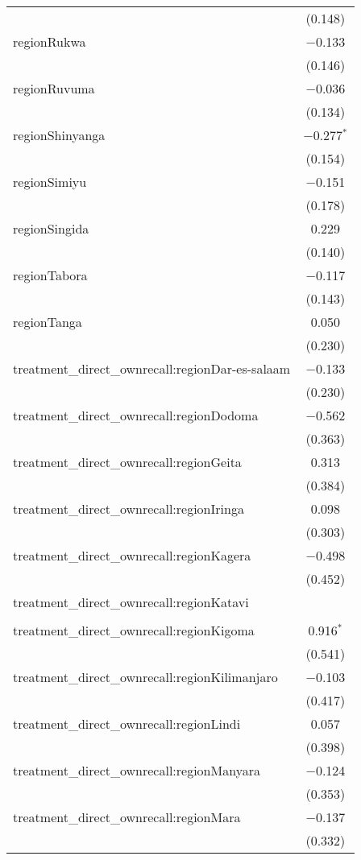 \begin{table}[!htbp]
\begin{tabular}{@{\extracolsep{5pt}}lc}
  & (0.148) \\ 
  regionRukwa & $-$0.133 \\ 
  & (0.146) \\ 
  regionRuvuma & $-$0.036 \\ 
  & (0.134) \\ 
  regionShinyanga & $-$0.277$^{*}$ \\ 
  & (0.154) \\ 
  regionSimiyu & $-$0.151 \\ 
  & (0.178) \\ 
  regionSingida & 0.229 \\ 
  & (0.140) \\ 
  regionTabora & $-$0.117 \\ 
  & (0.143) \\ 
  regionTanga & 0.050 \\ 
  & (0.230) \\ 
  treatment\_direct\_ownrecall:regionDar-es-salaam & $-$0.133 \\ 
  & (0.230) \\ 
  treatment\_direct\_ownrecall:regionDodoma & $-$0.562 \\ 
  & (0.363) \\ 
  treatment\_direct\_ownrecall:regionGeita & 0.313 \\ 
  & (0.384) \\ 
  treatment\_direct\_ownrecall:regionIringa & 0.098 \\ 
  & (0.303) \\ 
  treatment\_direct\_ownrecall:regionKagera & $-$0.498 \\ 
  & (0.452) \\ 
  treatment\_direct\_ownrecall:regionKatavi &  \\ 
  &  \\ 
  treatment\_direct\_ownrecall:regionKigoma & 0.916$^{*}$ \\ 
  & (0.541) \\ 
  treatment\_direct\_ownrecall:regionKilimanjaro & $-$0.103 \\ 
  & (0.417) \\ 
  treatment\_direct\_ownrecall:regionLindi & 0.057 \\ 
  & (0.398) \\ 
  treatment\_direct\_ownrecall:regionManyara & $-$0.124 \\ 
  & (0.353) \\ 
  treatment\_direct\_ownrecall:regionMara & $-$0.137 \\ 
  & (0.332) \\ 

\end{tabular}
\end{table}
